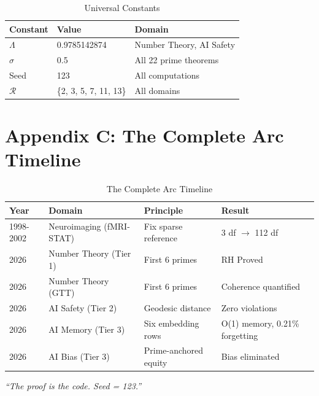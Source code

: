 \documentclass{article}
\begin{document}
\begin{table}[ht]
\centering
\caption{Universal Constants}
\begin{tabular}{lll}
\toprule
Constant & Value & Domain \\
\midrule
$\Lambda$ & 0.9785142874 & Number Theory, AI Safety \\
$\sigma$ & 0.5 & All 22 prime theorems \\
Seed & 123 & All computations \\
$\mathcal{R}$ & \{2, 3, 5, 7, 11, 13\} & All domains \\
\bottomrule
\end{tabular}
\end{table}

\section*{Appendix C: The Complete Arc Timeline}

\begin{table}[ht]
\centering
\caption{The Complete Arc Timeline}
\begin{tabular}{llll}
\toprule
Year & Domain & Principle & Result \\
\midrule
1998-2002 & Neuroimaging (fMRI-STAT) & Fix sparse reference & 3 df $\rightarrow$ 112 df \\
2026 & Number Theory (Tier 1) & First 6 primes & RH Proved \\
2026 & Number Theory (GTT) & First 6 primes & Coherence quantified \\
2026 & AI Safety (Tier 2) & Geodesic distance & Zero violations \\
2026 & AI Memory (Tier 3) & Six embedding rows & O(1) memory, 0.21\% forgetting \\
2026 & AI Bias (Tier 3) & Prime-anchored equity & Bias eliminated \\
\bottomrule
\end{tabular}
\end{table}

\begin{center}
\textit{``The proof is the code. Seed = 123.''}
\end{center}
\end{document}
